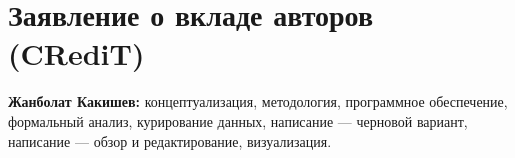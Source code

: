 \documentclass[12pt]{article}
\begin{document}
\section*{Заявление о вкладе авторов (CRediT)}
\textbf{Жанболат Какишев:} концептуализация, методология, программное обеспечение,
формальный анализ, курирование данных, написание — черновой вариант, написание — обзор и
редактирование, визуализация.



\end{document}
